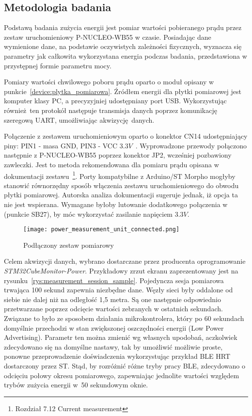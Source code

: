 \subsection{Metodologia badania}

Podstawą badania zużycia energii jest pomiar wartości pobieranego prądu przez zestaw uruchomieniowy
P-NUCLEO-WB55 w czasie. Posiadając dane wymienione dane, na podstawie oczywistych
zależności fizycznych, wyznacza się parametry jak całkowita wykorzystana energia
podczas badania, przedstawiona w przystępnej formie parametru mocy.

Pomiary wartości chwilowego poboru prądu oparto o moduł opisany w punkcie~\ref{device:plytka_pomiarowa}.
Źródłem energii dla płytki pomiarowej jest komputer klasy PC, a precyzyjniej udostępniany
port USB. Wykorzystując również ten protokół następuje transmisja danych poprzez komunikację szeregową
UART, umożliwiając akwizycję danych.

Połączenie z zestawem uruchomieniowym oparto o konektor CN14 udostępniający piny: PIN1 - masa GND, PIN3 - VCC $3.3V$~\cite{noauthor_um2243_2018}.
Wyprowadzone przewody połączono następnie z P-NUCLEO-WB55 poprzez konektor JP2, wcześniej pozbawiony zawleczki.
Jest to metoda rekomendowana dla pomiaru prądu opisana w dokumentacji zestawu~\cite{stmicroelectronics_um2435_2019}\footnote{
Rozdział 7.12 Current measurement}. Porty kompatybilne z Arduino/ST Morpho mogłyby stanowić równorzędny sposób
włączenia zestawu uruchomieniowego do obwodu płytki pomiarowej. Autorska analiza dokumentacji sugeruje jednak,
iż opcja ta nie jest wspierana. Wymagane byłoby lutowanie dodatkowego połączenia w (punkcie SB27), by móc wykorzystać
zasilanie napięciem $3.3V$.

\begin{figure}[!ht]
	\centering \texttt{[image: power\_measurement\_unit\_connected.png]}
	\caption{Podłączony zestaw pomiarowy}
	\label{rys:connected_power_measurement_unit}
\end{figure}

Celem akwizycji danych, wybrano dostarczane przez producenta oprogramowanie \textit{STM32CubeMonitor-Power}.
Przykładowy zrzut ekranu zaprezentowany jest na rysunku~\ref{rys:measurement_session_sample}.
Pojedyncza sesja pomiarowa trwająca 100 sekund zapewnia niezbędne dane. Węzły sieci
były oddalone od siebie nie dalej niż na odległość 1,5 metra. Są one następnie
odpowiednio przetwarzane poprzez odcięcie wartości zebranych w ostatnich sekundach. Związane to było
ze sposobem działania mikrokontrolera, który po 60 sekundach domyślnie przechodzi w stan zwiększonej
oszczędności energii (Low Power Advertising). Parametr ten można zmienić wg własnych upodobań, aczkolwiek zdecydowano
się na domyślne nastawy, tak by umożliwić możliwie proste, ponowne przeprowadzenie doświadczenia wykorzystując przykład
BLE \gls{HRT} dostarczony przez ST. Stąd, by rozróżnić różne tryby pracy \gls{BLE}, zdecydowano o odcięciu
połowy okresu pomiarowego, zapewniając jednolite wartości względem trybów zużycia energii
w~50 sekundowym oknie.

